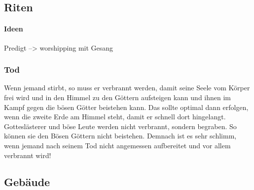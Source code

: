 \subsection{Riten}
\paragraph{Ideen}
\begin{outline}
	\1 Predigt --> worshipping mit Gesang
\end{outline}




\subsubsection{Tod}
Wenn jemand stirbt, so muss er verbrannt werden, damit seine Seele vom Körper frei wird und in den Himmel zu den Göttern aufsteigen kann und ihnen im Kampf gegen die bösen Götter beistehen kann. 
Das sollte optimal dann erfolgen, wenn die zweite Erde am Himmel steht, damit er schnell dort hingelangt. 
Gotteslästerer und böse Leute werden nicht verbrannt, sondern begraben. 
So können sie den Bösen Göttern nicht beistehen.
Demnach ist es sehr schlimm, wenn jemand nach seinem Tod nicht angemessen aufbereitet und vor allem verbrannt wird!

\subsection{Gebäude}
